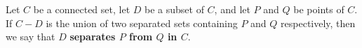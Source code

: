 Let $C$ be a connected set, let $D$ be a subset of $C$, and let $P$ and $Q$ be points of $C$. If $C - D$ is the union of two separated sets containing $P$ and $Q$ respectively, then we say that $D$ \textbf{separates $P$ from $Q$ in $C$}.

